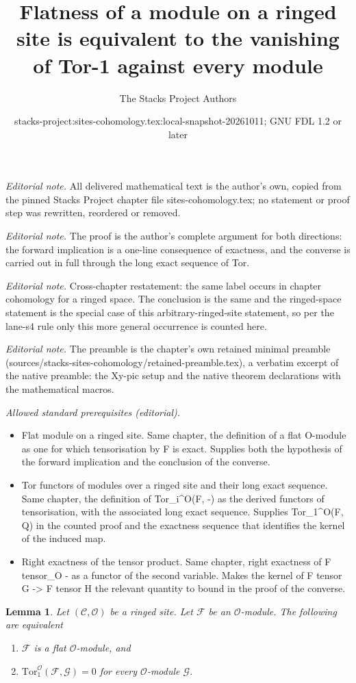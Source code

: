 \documentclass[10pt,a4paper]{amsart}
\title{Flatness of a module on a ringed site is equivalent to the vanishing of Tor-1 against every module}
\author{The Stacks Project Authors}
\date{stacks-project:sites-cohomology.tex:local-snapshot-20261011; GNU FDL 1.2 or later}
\theoremstyle{plain}
\newtheorem{lemma}[subsection]{Lemma}
\theoremstyle{definition}
\theoremstyle{remark}
\numberwithin{equation}{subsection}
\begin{document}
\maketitle
\noindent\textit{Editorial note.} All delivered mathematical text is the author's own, copied from the pinned Stacks Project chapter file sites-cohomology.tex; no statement or proof step was rewritten, reordered or removed.\par\medskip
\noindent\textit{Editorial note.} The proof is the author's complete argument for both directions: the forward implication is a one-line consequence of exactness, and the converse is carried out in full through the long exact sequence of Tor.\par\medskip
\noindent\textit{Editorial note.} Cross-chapter restatement: the same label occurs in chapter cohomology for a ringed space. The conclusion is the same and the ringed-space statement is the special case of this arbitrary-ringed-site statement, so per the lane-s4 rule only this more general occurrence is counted here.\par\medskip
\noindent\textit{Editorial note.} The preamble is the chapter's own retained minimal preamble (sources/stacks-sites-cohomology/retained-preamble.tex), a verbatim excerpt of the native preamble: the Xy-pic setup and the native theorem declarations with the mathematical macros.\par\medskip
\noindent\textit{Allowed standard prerequisites (editorial).}\begin{itemize}
\item Flat module on a ringed site. Same chapter, the definition of a flat O-module as one for which tensorisation by F is exact. Supplies both the hypothesis of the forward implication and the conclusion of the converse.
\item Tor functors of modules over a ringed site and their long exact sequence. Same chapter, the definition of Tor\_i\textasciicircum{}O(F, -) as the derived functors of tensorisation, with the associated long exact sequence. Supplies Tor\_1\textasciicircum{}O(F, Q) in the counted proof and the exactness sequence that identifies the kernel of the induced map.
\item Right exactness of the tensor product. Same chapter, right exactness of F tensor\_O - as a functor of the second variable. Makes the kernel of F tensor G -> F tensor H the relevant quantity to bound in the proof of the converse.
\end{itemize}\medskip
\begin{lemma}
\label{lemma-flat-tor-zero}
Let $(\mathcal{C}, \mathcal{O})$ be a ringed site.
Let $\mathcal{F}$ be an $\mathcal{O}$-module.
The following are equivalent
\begin{enumerate}
\item $\mathcal{F}$ is a flat $\mathcal{O}$-module, and
\item $\text{Tor}_1^\mathcal{O}(\mathcal{F}, \mathcal{G}) = 0$
for every $\mathcal{O}$-module $\mathcal{G}$.
\end{enumerate}
\end{lemma}
\end{document}
